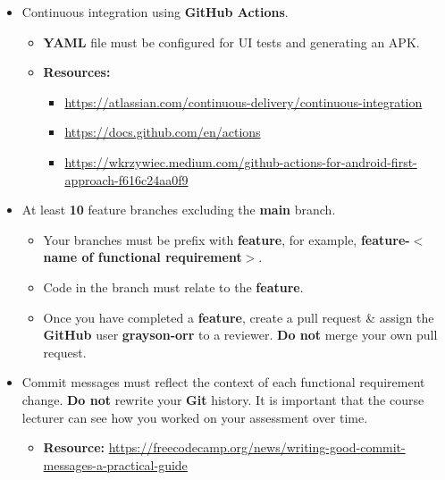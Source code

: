 \documentclass{article}
\begin{document}
			\begin{itemize}
				\item Continuous integration using \textbf{GitHub Actions}.
	      \begin{itemize}
		      \item \textbf{YAML} file must be configured for UI tests and generating an APK.
		      \item \textbf{Resources:}
		      \begin{itemize}
						\item \footnotesize\href{https://atlassian.com/continuous-delivery/continuous-integration}{https://atlassian.com/continuous-delivery/continuous-integration}
						\item \footnotesize\href{https://docs.github.com/en/actions}{https://docs.github.com/en/actions}
						\item \footnotesize\href{https://wkrzywiec.medium.com/github-actions-for-android-first-approach-f616c24aa0f9}{https://wkrzywiec.medium.com/github-actions-for-android-first-approach-f616c24aa0f9}
					\end{itemize}
	      \end{itemize}
	\item At least \textbf{10} feature branches excluding the \textbf{main} branch.
	      \begin{itemize}
		      \item Your branches must be prefix with \textbf{feature}, for example, \textbf{feature-$<$name of functional requirement$>$}.
		      \item Code in the branch must relate to the \textbf{feature}.
		      \item Once you have completed a \textbf{feature}, create a pull request \& assign the \textbf{GitHub} user \textbf{grayson-orr} to a reviewer. \textbf{Do not} merge your own pull request.
	      \end{itemize}
	\item Commit messages must reflect the context of each functional requirement change. \textbf{Do not} rewrite your \textbf{Git} history. It is important that the course lecturer can see how you worked on your assessment over time.
	      \begin{itemize}
		      \item \textbf{Resource:} \footnotesize\href{https://freecodecamp.org/news/writing-good-commit-messages-a-practical-guide}{https://freecodecamp.org/news/writing-good-commit-messages-a-practical-guide}
	      \end{itemize}
\end{itemize}
\end{document}
